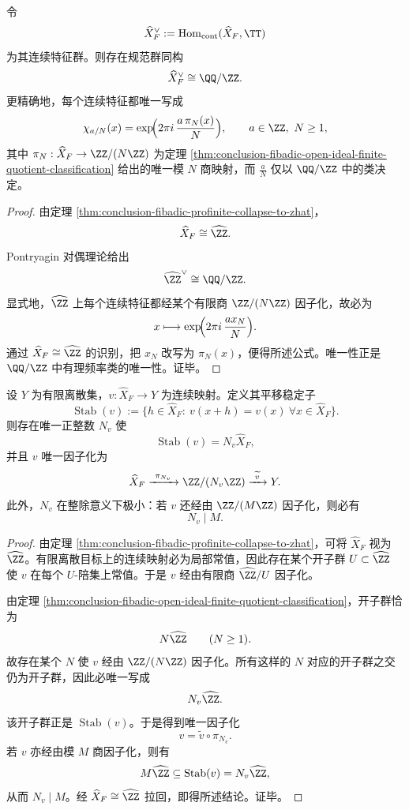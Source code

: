 \begin{theorem}\label{thm:conclusion-fibadic-address-pontryagin-dual-qmodz}
令
\[
\widehat X_F^\vee:=\operatorname{Hom}_{\mathrm{cont}}(\widehat X_F,\TT)
\]
为其连续特征群。则存在规范群同构
\[
\widehat X_F^\vee\cong \QQ/\ZZ.
\]
更精确地，每个连续特征都唯一写成
\[
\chi_{a/N}(x)
=
\exp\!\Bigl(2\pi i\,\frac{a\,\pi_N(x)}{N}\Bigr),
\qquad
a\in\ZZ,\ N\ge 1,
\]
其中 \(\pi_N:\widehat X_F\to \ZZ/(N\ZZ)\) 为定理 \ref{thm:conclusion-fibadic-open-ideal-finite-quotient-classification} 给出的唯一模 \(N\) 商映射，而 \(\frac{a}{N}\) 仅以 \(\QQ/\ZZ\) 中的类决定。
\end{theorem}
\begin{proof}
由定理 \ref{thm:conclusion-fibadic-profinite-collapse-to-zhat}，
\[
\widehat X_F\cong \widehat{\ZZ}.
\]
Pontryagin 对偶理论给出
\[
\widehat{\ZZ}^\vee\cong \QQ/\ZZ.
\]
显式地，\(\widehat{\ZZ}\) 上每个连续特征都经某个有限商 \(\ZZ/(N\ZZ)\) 因子化，故必为
\[
x\longmapsto \exp\!\Bigl(2\pi i\,\frac{a x_N}{N}\Bigr).
\]
通过 \(\widehat X_F\cong \widehat{\ZZ}\) 的识别，把 \(x_N\) 改写为 \(\pi_N(x)\)，便得所述公式。唯一性正是 \(\QQ/\ZZ\) 中有理频率类的唯一性。证毕。
\end{proof}

\begin{theorem}[有限值连续观测的算术导体]\label{thm:conclusion-fibadic-finite-valued-observable-conductor}
设 \(Y\) 为有限离散集，\(v:\widehat X_F\to Y\) 为连续映射。定义其平移稳定子
\[
\operatorname{Stab}(v)
:=
\{h\in \widehat X_F:\ v(x+h)=v(x)\ \forall x\in \widehat X_F\}.
\]
则存在唯一正整数 \(N_v\) 使
\[
\operatorname{Stab}(v)=N_v\widehat X_F,
\]
并且 \(v\) 唯一因子化为
\[
\widehat X_F\xrightarrow{\ \pi_{N_v}\ } \ZZ/(N_v\ZZ)\xrightarrow{\ \widetilde v\ } Y.
\]
此外，\(N_v\) 在整除意义下极小：若 \(v\) 还经由 \(\ZZ/(M\ZZ)\) 因子化，则必有
\[
N_v\mid M.
\]
\end{theorem}
\begin{proof}
由定理 \ref{thm:conclusion-fibadic-profinite-collapse-to-zhat}，可将 \(\widehat X_F\) 视为 \(\widehat{\ZZ}\)。有限离散目标上的连续映射必为局部常值，因此存在某个开子群 \(U\subset \widehat{\ZZ}\) 使 \(v\) 在每个 \(U\)-陪集上常值。于是 \(v\) 经由有限商 \(\widehat{\ZZ}/U\) 因子化。

由定理 \ref{thm:conclusion-fibadic-open-ideal-finite-quotient-classification}，开子群恰为
\[
N\widehat{\ZZ}\qquad (N\ge 1).
\]
故存在某个 \(N\) 使 \(v\) 经由 \(\ZZ/(N\ZZ)\) 因子化。所有这样的 \(N\) 对应的开子群之交仍为开子群，因此必唯一写成
\[
N_v\widehat{\ZZ}.
\]
该开子群正是 \(\operatorname{Stab}(v)\)。于是得到唯一因子化
\[
v=\widetilde v\circ \pi_{N_v}.
\]
若 \(v\) 亦经由模 \(M\) 商因子化，则有
\[
M\widehat{\ZZ}\subseteq \operatorname{Stab}(v)=N_v\widehat{\ZZ},
\]
从而 \(N_v\mid M\)。经 \(\widehat X_F\cong \widehat{\ZZ}\) 拉回，即得所述结论。证毕。
\end{proof}

